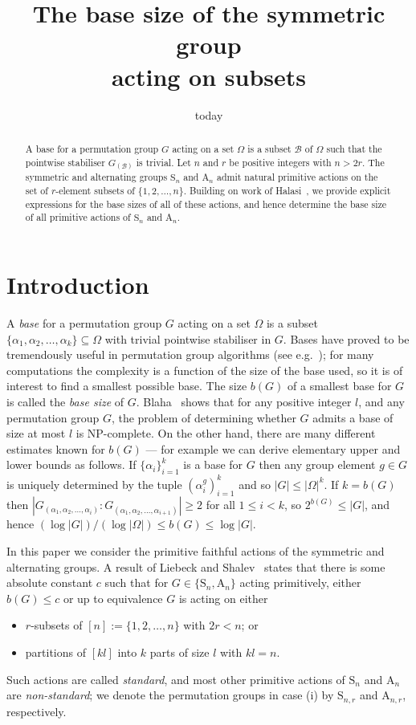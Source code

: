 \documentclass[ALCO,published]{cedram}
\title[Base size of the symmetric group]{The base size of the symmetric group \\acting on subsets}
\author[\initial{C.} del Valle]{\firstname{Coen} \lastname{del Valle}}
\author[\initial{C.} \middlename{M.} Roney-Dougal]{\firstname{Colva} \middlename{M.} \lastname{Roney-Dougal}}
\renewcommand\S{\mathrm{S}}
\begin{document}
\date{today}

\begin{abstract}
A base for a permutation group $G$ acting on a set $\Omega$ is a subset $\mathcal{B}$ of $\Omega$ such that the pointwise stabiliser $G_{(\mathcal{B})}$ is trivial. Let $n$ and $r$ be positive integers with $n>2r$. The symmetric and alternating groups $\mathrm{S}_n$ and $\mathrm{A}_n$ admit natural primitive actions on the set of $r$-element subsets of $\{1,2,\dots, n\}$. Building on work of Halasi~\cite{hal}, we provide explicit expressions for the base sizes of all of these actions, and hence determine the base size of all primitive actions of $\mathrm{S}_n$ and $\mathrm{A}_n$.
\end{abstract}

\maketitle

\section{Introduction}

A \emph{base} for a permutation group $G$ acting on a set $\Omega$ is a subset $\{\alpha_1,\alpha_2,\dots, \alpha_k\}\subseteq\Omega$ with trivial pointwise stabiliser in $G$. Bases have proved to be tremendously useful in permutation group algorithms (see e.g.~\cite{ser}); for many computations the complexity is a function of the size of the base used, so it is of interest to find a smallest possible base. The size $b(G)$ of a smallest base for $G$ is called the \emph{base size} of $G$. Blaha~\cite{blaha} shows that for any positive integer $l$, and any permutation group $G$, the problem of determining whether $G$ admits a base of size at most $l$ is NP-complete. On the other hand, there are many different estimates known for $b(G)$ --- for example we can derive elementary upper and lower bounds as follows. If $\{\alpha_i\}_{i=1}^{k}$ is a base for $G$ then any group element $g\in G$ is uniquely determined by the tuple $(\alpha_i^g)_{i=1}^{k}$ and so $|G|\leq |\Omega|^{k}$. If $k=b(G)$ then $|G_{(\alpha_1,\alpha_2,\dots,\alpha_i)} : G_{(\alpha_1,\alpha_2,\dots,\alpha_{i+1})}|\geq 2$ for all $1\leq i<k$, so $2^{b(G)}\leq |G|$, and hence $(\log |G|)/(\log |\Omega|)\leq b(G)\leq \log |G|$.

In this paper we consider the primitive faithful actions of the symmetric and alternating groups. A result of Liebeck and Shalev~\cite{lie3} states that there is some absolute constant $c$ such that for $G\in\{\S_n,\mathrm{A}_n\}$ acting primitively, either $b(G)\leq c$ or up to equivalence $G$ is acting on either
\begin{itemize}
    \item[(i)] $r$-subsets of $[n]:=\{1,2,\dots, n\}$ with $2r<n$; or
    \item[(ii)] partitions of $[kl]$ into $k$ parts of size $l$ with $kl=n$.
\end{itemize}
Such actions are called \emph{standard}, and most other primitive actions of $\S_n$ and $\mathrm{A}_n$ are \emph{non-standard}; we denote the permutation groups in case (i) by $\S_{n,r}$ and $\mathrm{A}_{n,r}$, respectively.
\end{document}
